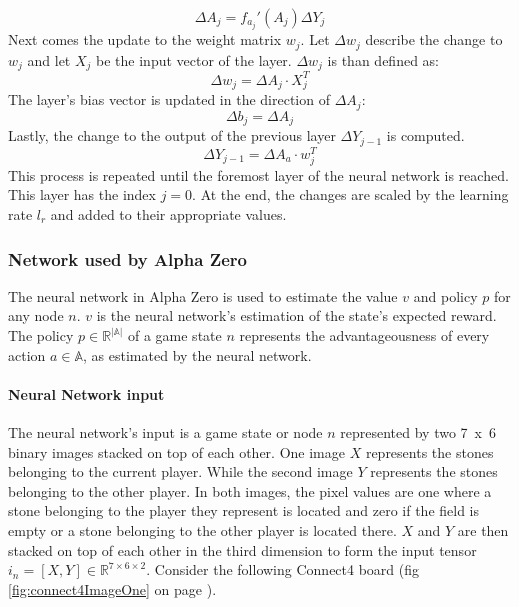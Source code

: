 \documentclass[12pt]{article}
\newcommand{\imgRef}[1]{(fig \ref{#1} on page \pageref{#1})}
\begin{document}
\begin{equation}\label{eq:NN:deltaA}
\Delta A_j = f_{a_j}'(A_j)\Delta Y_j
\end{equation}
Next comes the update to the weight matrix \(w_j\). Let \(\Delta w_j\) describe the change to \(w_j\) and let \(X_j\) be the input vector of the layer. \(\Delta w_j\) is than defined as:
\begin{equation}\label{eq:NN:deltaW}
\Delta w_j = \Delta A_j \cdot X_j^T
\end{equation}
The layer's bias vector is updated in the direction of \(\Delta A_j\):
\begin{equation}\label{eq:NN:deltaB}
\Delta b_j = \Delta A_j
\end{equation}
Lastly, the change to the output of the previous layer \(\Delta Y_{j-1}\) is computed.
\begin{equation} \label{eq:NN:deltaA_lastLayer}
\Delta Y_{j-1} = \Delta A_a \cdot w_j^T
\end{equation}
This process is repeated until the foremost layer of the neural network is reached. This layer has the index \(j=0\). At the end, the changes are scaled by the learning rate \(l_r\) and added to their appropriate values.\\

\subsubsection{Network used by Alpha Zero}
The neural network in Alpha Zero is used to estimate the value \(v\) and policy \(p\) for any node \(n\). \(v\) is the neural network's estimation of the state's expected reward. The policy \(p \in\mathbb{R}^{|\mathbb{A}|}\) of a game state \(n\) represents the advantageousness of every action \(a\in\mathbb{A}\), as estimated by the neural network.
\paragraph{Neural Network input}\label{sec:neuralNetworkInput}
The neural network's input is a game state or node \(n\) represented by two \mbox{7 x 6} binary images stacked on top of each other. One image \(X\) represents the stones belonging to the current player. While the second image \(Y\) represents the stones belonging to the other player. In both images, the pixel values are one where a stone belonging to the player they represent is located and zero if the field is empty or a stone belonging to the other player is located there. \(X\) and \(Y\) are then stacked on top of each other in the third dimension to form the input tensor \(i_n = [X, Y] \in \mathbb{R}^{7 \times 6 \times 2}\).
Consider the following Connect4 board \imgRef{fig:connect4ImageOne}.
\end{document}
